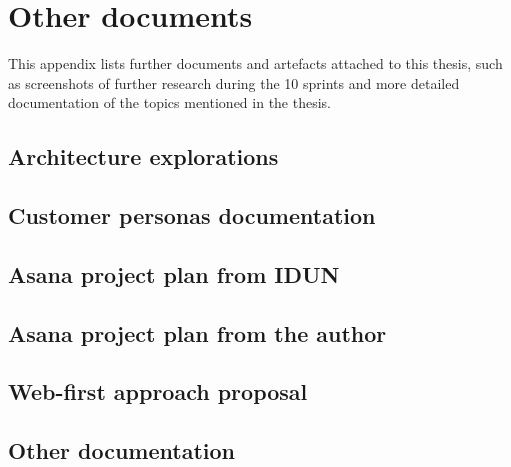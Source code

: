 \chapter{Other documents}
\label{appendix7-other-documents}

This appendix lists further documents and artefacts attached to this thesis, such as screenshots of further research during the 10 sprints and more detailed documentation of the topics mentioned in the thesis.

\section*{Architecture explorations}

\section*{Customer personas documentation}

\section*{Asana project plan from IDUN}

\section*{Asana project plan from the author}

\section*{Web-first approach proposal}

\section*{Other documentation}
